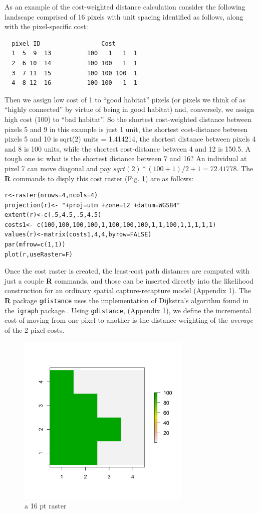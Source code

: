 \documentclass[12pt]{article}
\begin{document}
As an example of the cost-weighted distance calculation consider the
following landscape comprised of 16 pixels with unit spacing
identified as follows, along with the pixel-specific cost:
\begin{verbatim}
  pixel ID                 Cost
  1  5  9  13          100   1   1  1
  2  6 10  14          100 100   1  1
  3  7 11  15          100 100 100  1
  4  8 12  16          100 100   1  1
\end{verbatim}
Then we assign low cost of 1 to ``good habitat'' pixels (or pixels we
think of as ``highly connected'' by virtue of being in good habitat)
and, conversely, we assign high cost (100) to ``bad habitat''. So the
shortest cost-weighted distance between pixels 5 and 9 in this example
is just 1 unit, the shortest cost-distance between pixels 5 and 10 is
sqrt(2) units = 1.414214, the shortest distance between pixels 4 and 8 is 100
units, while the shortest cost-distance between 4 and 12 is 150.5. A
tough one is: what is the shortest distance between 7 and 16? An
individual at pixel 7 can move diagonal and pay  $sqrt(2)*(100+1)/2 + 1 =72.41778$.
The {\bf R} commands to disply this cost raster
(Fig. \ref{ecoldist.fig.raster})  are as follows:
\begin{verbatim}
r<-raster(nrows=4,ncols=4)
projection(r)<- "+proj=utm +zone=12 +datum=WGS84"
extent(r)<-c(.5,4.5,.5,4.5)
costs1<- c(100,100,100,100,1,100,100,100,1,1,100,1,1,1,1,1)
values(r)<-matrix(costs1,4,4,byrow=FALSE)
par(mfrow=c(1,1))
plot(r,useRaster=F)
\end{verbatim}
Once the cost raster is created, the least-cost path distances are
computed with just a couple {\bf R} commands, and those can be
inserted directly into the likelihood construction for an ordinary
spatial capture-recapture model (Appendix 1). The {\bf R} package
\mbox{\tt gdistance} uses 
 the implementation of Dijkstra's algorithm
\citep{dijkstra:1959} found in the \mbox{\tt igraph} package
\citep{csardi:2010}.
Using \mbox{\tt gdistance}, (Appendix 1),
we define the incremental cost of moving
from one pixel to another is the distance-weighting of the {\it
  average} of the 2 pixel costs.


\begin{figure}
\begin{center}
\includegraphics[height=3.25in,width=3.25in]{figs/raster_2values}
\end{center}
\caption{a 16 pt raster}
\label{ecoldist.fig.raster}
\end{figure}
\end{document}
